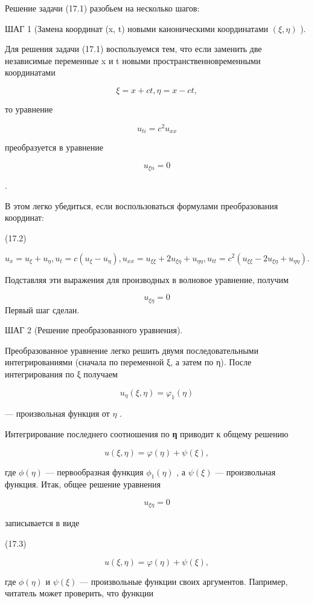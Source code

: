 \documentclass[
  ukrainian,
]{article}
\begin{document}
Решение задачи (17.1) разобьем на несколько шагов:

ШАГ 1 (Замена координат (x, t) новыми каноническими координатами
\((\xi, \eta)\) ).

Для решения задачи (17.1) воспользуемся тем, что если заменить две
независимые переменные x и t новыми пространственновременными
координатами

\[
\xi = x + ct,
\eta = x - ct,
\]

то уравнение

\[
u_{ti} = c^2 u_{xx}
\]

преобразуется в уравнение

\[
u_{\xi n} = 0
\]

.

В этом легко убедиться, если воспользоваться формулами преобразования
координат:

(17.2)

\[
u_{x} = u_{\xi} + u_{\eta}, u_{t} = c (u_{\xi} - u_{\eta}), u_{xx} = u_{\xi\xi} + 2u_{\xi\eta} + u_{\eta\eta}, u_{tt} = c^{2} (u_{\xi\xi} - 2u_{\xi\eta} + u_{\eta\eta}).
\]

Подставляя эти выражения для производных в волновое уравнение, получим

\[
u_{\xi\eta} = 0
\] Первый шаг сделан.

ШАГ 2 (Решение преобразованного уравнения).

Преобразованное уравнение легко решить двумя последовательными
интегрированиями (сначала по переменной ξ, а затем по η). После
интегрирования по ξ получаем

\[
u_{\eta}(\xi, \eta) = \varphi_{1}(\eta)
\]

--- произвольная функция от \(\eta\) .

Интегрирование последнего соотношения по \textbf{η} приводит к общему
решению

\[
u(\xi, \eta) = \varphi(\eta) + \psi(\xi),
\]

где \(\phi(\eta)\) --- первообразная функция \(\phi_1(\eta)\) , а
\(\psi(\xi)\) --- произвольная функция. Итак, общее решение уравнения

\[
u_{\xi\eta} = 0
\]

записывается в виде

(17.3)

\[
u(\xi, \eta) = \varphi(\eta) + \psi(\xi),
\]

где \(\phi(\eta)\) и \(\psi(\xi)\) --- произвольные функции своих
аргументов. Папример, читатель может проверить, что функции
\end{document}
